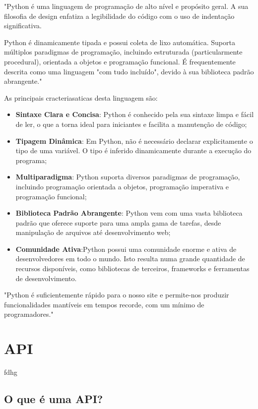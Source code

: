 "Python é uma linguagem de programação de alto nível e propósito geral. A sua filosofia
de design enfatiza a legibilidade do código com o uso de indentação significativa.

Python é dinamicamente tipada e possui coleta de lixo automática. 
Suporta múltiplos paradigmas de programação, incluindo estruturada (particularmente 
procedural), orientada a objetos e programação funcional. É frequentemente descrita como 
uma linguagem "com tudo incluído", devido à sua biblioteca padrão abrangente." \cite{python}



As principais cracteriasaticas desta linguagem são:

\begin{itemize}
\item \textbf{Sintaxe Clara e Concisa}: Python é conhecido pela sua sintaxe limpa
e fácil de ler, o que a torna ideal para iniciantes e facilita a manutenção de código;
\item \textbf{Tipagem Dinâmica}: Em Python, não é necessário declarar explicitamente o
tipo de uma variável. O tipo é inferido dinamicamente durante a execução do programa;
\item \textbf{Multiparadigma}: Python suporta diversos paradigmas de programação,
incluindo programação orientada a objetos, programação imperativa e programação funcional;
\item \textbf{Biblioteca Padrão Abrangente}: Python vem com uma vasta biblioteca 
padrão que oferece suporte para uma ampla gama de tarefas, desde manipulação de arquivos 
até desenvolvimento web;
\item \textbf{Comunidade Ativa}:Python possui uma comunidade
enorme e ativa de desenvolvedores em todo o mundo. Isto resulta numa grande quantidade
de recursos disponíveis, como bibliotecas de terceiros, frameworks e ferramentas 
de desenvolvimento.
\end{itemize}


"Python é suficientemente rápido para o nosso site e permite-nos produzir funcionalidades 
mantíveis em tempos recorde, com um mínimo de programadores." \cite{pyyt}

\section{API}

fdhg

\subsection{O que é uma API?}

